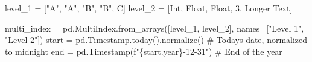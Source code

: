 \documentclass[
  11pt,
  a4paper,
  DIV=11,
  numbers=noendperiod]{scrartcl}
\newenvironment{Shaded}{\begin{snugshade}}{\end{snugshade}}
\newcommand{\CommentTok}[1]{\textcolor[rgb]{0.37,0.37,0.37}{#1}}
\newcommand{\DecValTok}[1]{\textcolor[rgb]{0.68,0.00,0.00}{#1}}
\newcommand{\NormalTok}[1]{\textcolor[rgb]{0.00,0.23,0.31}{#1}}
\newcommand{\OperatorTok}[1]{\textcolor[rgb]{0.37,0.37,0.37}{#1}}
\newcommand{\SpecialCharTok}[1]{\textcolor[rgb]{0.37,0.37,0.37}{#1}}
\newcommand{\SpecialStringTok}[1]{\textcolor[rgb]{0.13,0.47,0.30}{#1}}
\newcommand{\StringTok}[1]{\textcolor[rgb]{0.13,0.47,0.30}{#1}}
\begin{document}
\begin{Shaded}
\begin{Highlighting}[]
\NormalTok{level\_1 }\OperatorTok{=}\NormalTok{ [}\StringTok{"A"}\NormalTok{, }\StringTok{"A"}\NormalTok{, }\StringTok{"B"}\NormalTok{, }\StringTok{"B"}\NormalTok{, }\StringTok{\textquotesingle{}C\textquotesingle{}}\NormalTok{]}
\NormalTok{level\_2 }\OperatorTok{=}\NormalTok{ [}\StringTok{\textquotesingle{}Int\textquotesingle{}}\NormalTok{, }\StringTok{\textquotesingle{}Float\textquotesingle{}}\NormalTok{, }\StringTok{\textquotesingle{}Float\textquotesingle{}}\NormalTok{, }\DecValTok{3}\NormalTok{, }\StringTok{\textquotesingle{}Longer Text\textquotesingle{}}\NormalTok{]}

\NormalTok{multi\_index }\OperatorTok{=}\NormalTok{ pd.MultiIndex.from\_arrays([level\_1, level\_2],}
\NormalTok{        names}\OperatorTok{=}\NormalTok{[}\StringTok{"Level 1"}\NormalTok{, }\StringTok{"Level 2"}\NormalTok{])}
\NormalTok{start }\OperatorTok{=}\NormalTok{ pd.Timestamp.today().normalize()  }\CommentTok{\# Today\textquotesingle{}s date, normalized to midnight}
\NormalTok{end }\OperatorTok{=}\NormalTok{ pd.Timestamp(}\SpecialStringTok{f"}\SpecialCharTok{\{}\NormalTok{start}\SpecialCharTok{.}\NormalTok{year}\SpecialCharTok{\}}\SpecialStringTok{{-}12{-}31"}\NormalTok{)  }\CommentTok{\# End of the year}


\end{Highlighting}
\end{Shaded}
\end{document}
